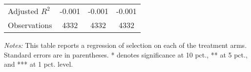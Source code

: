 \begin{table}[htbp]
{\begin{threeparttable}
\begin{tabular}{l*{3}{c}}
\midrule
Adjusted \(R^{2}\)&   -0.001         &   -0.001         &   -0.001         \\
Observations    &     4332         &     4332         &     4332         \\
\bottomrule \end{tabular} \begin{tablenotes}[flushleft] \footnotesize \item \emph{Notes:} This table reports a regression of selection on each of the treatment arms. Standard errors are in parentheses. * denotes significance at 10 pct., ** at 5 pct., and *** at 1 pct. level. \end{tablenotes} \end{threeparttable} } \end{table}

